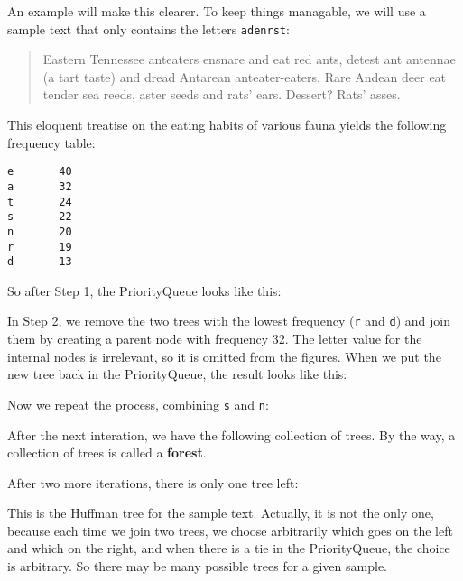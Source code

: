 An example will make this clearer.  To keep things managable,
we will use a sample text that only contains the letters
{\tt adenrst}:

\begin{quote}
Eastern Tennessee anteaters ensnare and eat red ants, detest ant
antennae (a tart taste) and dread Antarean anteater-eaters.
Rare Andean deer eat tender sea reeds, aster seeds and rats'
ears.  Dessert?  Rats' asses.
\end{quote}

This eloquent treatise on the eating habits of various fauna
yields the following frequency table:

\begin{verbatim}
e       40
a       32
t       24
s       22
n       20
r       19
d       13
\end{verbatim}

So after Step 1, the PriorityQueue looks like this:


In Step 2, we remove the two trees with the lowest frequency
({\tt r} and {\tt d}) and join them by creating a parent node
with frequency 32.  The letter value for the internal nodes is
irrelevant, so it is omitted from the figures.  When we put the
new tree back in the PriorityQueue, the result looks like this:


Now we repeat the process, combining {\tt s} and {\tt n}:


After the next interation, we have the following collection of
trees.  By the way, a collection of trees is called a {\bf forest}.




After two more iterations, there is only one tree left:


This is the Huffman tree for the sample text.  Actually, it is not the
only one, because each time we join two trees, we choose arbitrarily
which goes on the left and which on the right, and when there is a tie
in the PriorityQueue, the choice is arbitrary.  So there may be many
possible trees for a given sample.

